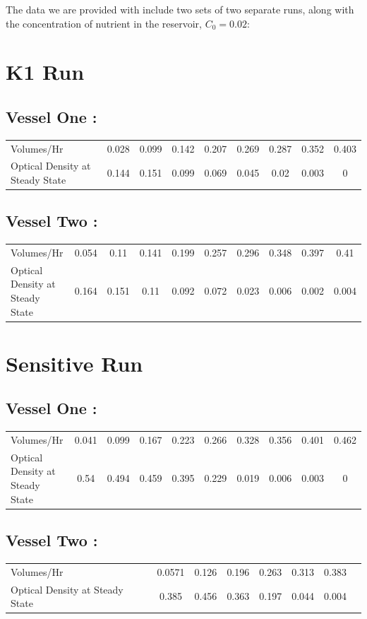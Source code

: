 The data we are provided with include two sets of two separate runs, along with the concentration of nutrient in the reservoir, $C_0 = 0.02$:
\section{K1 Run}
\subsection*{Vessel One :}
\begin{tabular}{l|cccccccc}
  Volumes/Hr & 0.028 & 0.099 & 0.142 & 0.207 & 0.269 & 0.287 & 0.352 & 0.403 \\
  Optical Density at Steady State & 0.144 & 0.151 & 0.099 & 0.069 & 0.045 & 0.02 & 0.003 & 0 \\
\end{tabular}

\subsection*{Vessel Two :}
\begin{tabular}{l|ccccccccc}
  Volumes/Hr & 0.054 & 0.11 & 0.141 & 0.199 & 0.257 & 0.296 & 0.348 & 0.397 & 0.41 \\
  Optical Density at Steady State & 0.164 & 0.151 & 0.11 & 0.092 & 0.072 & 0.023 & 0.006 & 0.002 & 0.004 \\
\end{tabular}

\section{Sensitive Run}
\subsection*{Vessel One :}
\begin{tabular}{l|ccccccccc}
  Volumes/Hr & 0.041 & 0.099 & 0.167 & 0.223 & 0.266 & 0.328 & 0.356 & 0.401 & 0.462 \\
 Optical Density at Steady State & 0.54 & 0.494 & 0.459 & 0.395 & 0.229 & 0.019 & 0.006 & 0.003 & 0  \\
\end{tabular}

\subsection*{Vessel Two :}
\begin{tabular}{l|ccccccc}
 Volumes/Hr & 0.0571 & 0.126 & 0.196 & 0.263 & 0.313 & 0.383  \\
  Optical Density at Steady State & 0.385 & 0.456 & 0.363 & 0.197 & 0.044 & 0.004 \\
\end{tabular}

